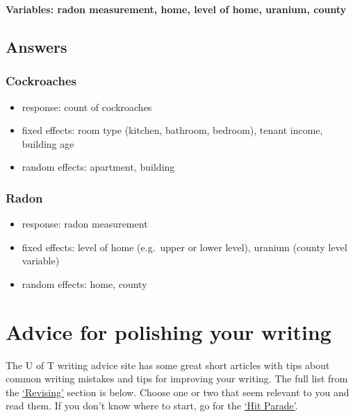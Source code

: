 \documentclass[
  openany]{book}
\providecommand{\tightlist}{%
  \setlength{\itemsep}{0pt}\setlength{\parskip}{0pt}}
\begin{document}
\textbf{Variables: radon measurement, home, level of home, uranium, county}

\hypertarget{answers}{%
\subsection{Answers}\label{answers}}

\hypertarget{cockroaches}{%
\subsubsection{Cockroaches}\label{cockroaches}}

\begin{itemize}
\tightlist
\item
  response: count of cockroaches
\item
  fixed effects: room type (kitchen, bathroom, bedroom), tenant income, building
  age
\item
  random effects: apartment, building
\end{itemize}

\hypertarget{radon}{%
\subsubsection{Radon}\label{radon}}

\begin{itemize}
\tightlist
\item
  response: radon measurement
\item
  fixed effects: level of home (e.g.~upper or lower level), uranium (county level variable)
\item
  random effects: home, county
\end{itemize}

\hypertarget{advice-for-polishing-your-writing}{%
\section{Advice for polishing your writing}\label{advice-for-polishing-your-writing}}

The U of T writing advice site has some great short articles with tips about common writing mistakes and tips for improving your writing. The full list from the \href{https://advice.writing.utoronto.ca/revising/}{`Revising'} section is below. Choose one or two that seem relevant to you and read them. If you don't know where to start, go for the \href{https://advice.writing.utoronto.ca/revising/hit-parade-of-errors/}{`Hit Parade'}.
\end{document}
